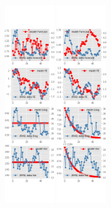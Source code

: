 \documentclass[]{article}
\begin{document}
\begin{figure}[ht]
\begin{subfigure}[b]{\textwidth}
		\includegraphics[width=0.24\textwidth]{figures/sce_ni_est_diag2.png}
		\includegraphics[width=0.24\textwidth]{figures/sce_ni_est_diag3.png}
	\end{subfigure}
	\vspace{1em}
	\vfill
	\begin{subfigure}[b]{\textwidth}

\end{subfigure}
\end{figure}
\end{document}
